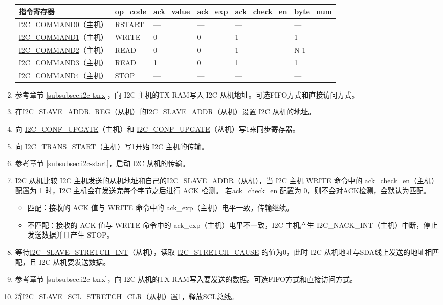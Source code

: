\documentclass[main\_\_CN.tex]{subfiles}
\begin{document}
\begin{enumerate}
\begin{longtable}{ | p{4cm} | p{2cm} | p{2cm} | p{2cm} |p{2cm} | p{2cm} |}
\hline\rowcolor{lightgray}
指令寄存器& op\_code & ack\_value&ack\_exp&ack\_check\_en&byte\_num  \\ \hline
\hyperref[fielddesc:I2CCOMMAND0]{I2C\_COMMAND0}（主机）& RSTART& ---&---&---&---  \\ \hline
\hyperref[fielddesc:I2CCOMMAND1]{I2C\_COMMAND1}（主机）& WRITE& 0&0&1&1  \\ \hline
\hyperref[fielddesc:I2CCOMMAND2]{I2C\_COMMAND2}（主机）& READ& 0&0&1&N-1  \\ \hline
\hyperref[fielddesc:I2CCOMMAND3]{I2C\_COMMAND3}（主机）& READ& 1&0&1&1  \\ \hline
\hyperref[fielddesc:I2CCOMMAND4]{I2C\_COMMAND4}（主机）& STOP& ---&---&---&---  \\ \hline
\end{longtable}
\item 参考章节 \ref{subsubsec:i2c-txrx}，向 I2C 主机的TX RAM写入 I2C 从机地址。可选FIFO方式和直接访问方式。
\item 在\hyperref[regdesc:I2CSLAVEADDRREG]{I2C\_SLAVE\_ADDR\_REG}（从机）的\hyperref[fielddesc:I2CSLAVEADDR]{I2C\_SLAVE\_ADDR}（从机）设置 I2C 从机的地址。
\item 向 \hyperref[fielddesc:I2CCONFUPGATE]{I2C\_CONF\_UPGATE}（主机）和 \hyperref[fielddesc:I2CCONFUPGATE]{I2C\_CONF\_UPGATE}（从机）写1来同步寄存器。
\item 向 \hyperref[fielddesc:I2CTRANSSTART]{I2C\_TRANS\_START}（主机）写1开始 I2C 主机的传输。
\item 参考章节 \ref{subsubsec:i2c-start}，启动 I2C 从机的传输。
\item I2C 从机比较 I2C 主机发送的从机地址和自己的\hyperref[fielddesc:I2CSLAVEADDR]{I2C\_SLAVE\_ADDR}（从机），当 I2C 主机 WRITE 命令中的 ack\_check\_en（主机）配置为 1 时，I2C 主机会在发送完每个字节之后进行 ACK 检测。 若ack\_check\_en 配置为 0，则不会对ACK检测，会默认为匹配。
\begin{itemize}
\item 匹配：接收的 ACK 值与 WRITE 命令中的 ack\_exp（主机）电平一致，传输继续。
\item 不匹配：接收的 ACK 值与 WRITE 命令中的 ack\_exp（主机）电平不一致，I2C 主机产生 I2C\_NACK\_INT（主机）中断，停止发送数据并且产生 STOP。
\end{itemize}

\item 等待\hyperref[int:i2c-slave-stretch]{I2C\_SLAVE\_STRETCH\_INT}（从机），读取 \hyperref[fielddesc:I2CSTRETCHCAUSE]{I2C\_STRETCH\_CAUSE} 的值为0，此时 I2C 从机地址与SDA线上发送的地址相匹配，且 I2C 从机要发送数据。
\item 参考章节 \ref{subsubsec:i2c-txrx}，向 I2C 从机的TX RAM写入要发送的数据。可选FIFO方式和直接访问方式。
\item 将\hyperref[fielddesc:I2CSLAVESCLSTRETCHCLR]{I2C\_SLAVE\_SCL\_STRETCH\_CLR}（从机）置1，释放SCL总线。


\end{enumerate}
\end{document}
